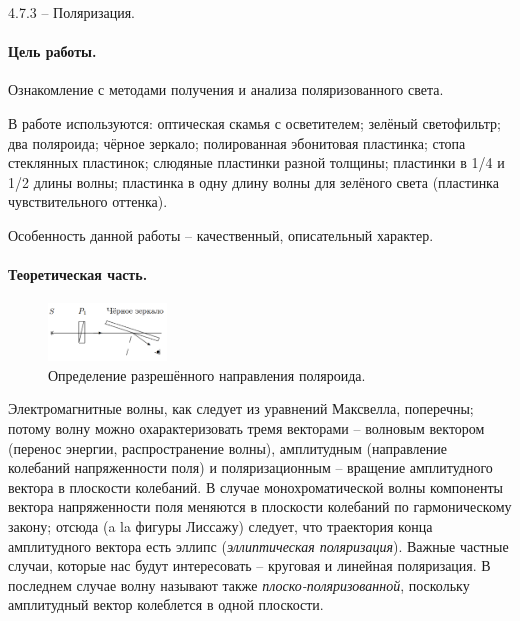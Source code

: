 \documentclass{../lab_class}
\begin{document}
{\Large 4.7.3 -- Поляризация.}

\paragraph{Цель работы.}
Ознакомление с методами получения и анализа поляризованного света.

В работе используются: оптическая скамья с осветителем; зелёный светофильтр; два поляроида; чёрное зеркало; полированная эбонитовая пластинка; стопа стеклянных пластинок; слюдяные пластинки разной толщины; пластинки в 1/4 и 1/2 длины волны; пластинка в одну длину волны для зелёного света (пластинка чувствительного оттенка).

Особенность данной работы -- качественный, описательный характер.

\paragraph{Теоретическая часть.}
\begin{figure}
  \vspace{-20pt}
  \begin{center}
    \includegraphics[width=0.28\textwidth]{01.png}
  \end{center}
  \vspace{-20pt}
  \caption{Определение разрешённого направления поляроида.}
  \label{fig:scheme01}
  \vspace{-10pt}
\end{figure}

Электромагнитные волны, как следует из уравнений Максвелла, поперечны; потому волну можно охарактеризовать тремя векторами -- волновым вектором (перенос энергии, распространение волны), амплитудным (направление колебаний напряженности поля) и поляризационным -- вращение амплитудного вектора в плоскости колебаний. В случае монохроматической волны компоненты вектора напряженности поля меняются в плоскости колебаний по гармоническому закону; отсюда (a la фигуры Лиссажу) следует, что траектория конца амплитудного вектора есть эллипс (\emph{эллиптическая поляризация}). Важные частные случаи, которые нас будут интересовать -- круговая и линейная поляризация. В последнем случае волну называют также \emph{плоско-поляризованной}, поскольку амплитудный вектор колеблется в одной плоскости. 
\end{document}
